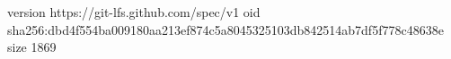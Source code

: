 version https://git-lfs.github.com/spec/v1
oid sha256:dbd4f554ba009180aa213ef874c5a8045325103db842514ab7df5f778c48638e
size 1869
